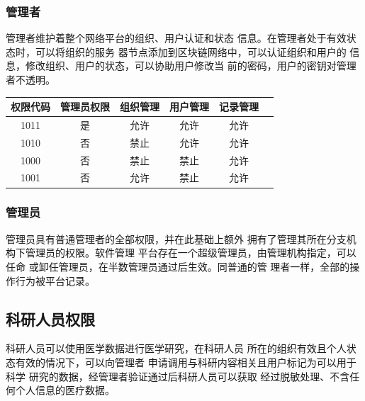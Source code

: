 \documentclass[UTF8]{ctexart}
\begin{document}
    \subsubsection{管理者}
    \par
    管理者维护着整个网络平台的组织、用户认证和状态
    信息。在管理者处于有效状态时，可以将组织的服务
    器节点添加到区块链网络中，可以认证组织和用户的
    信息，修改组织、用户的状态，可以协助用户修改当
    前的密码，用户的密钥对管理者不透明。
    \begin{center}
        \begin{tabular}{cccccc}
            \hline
            权限代码& 管理员权限& 组织管理& 用户管理& 记录管理\\
            \hline
            1011& 是& 允许& 允许& 允许\\
            1010& 否& 禁止& 允许& 允许\\
            1000& 否& 禁止& 禁止& 允许\\
            1001& 否& 允许& 禁止& 允许\\
            \hline
        \end{tabular}
    \end{center}
    \subsubsection{管理员}
    \par
    管理员具有普通管理者的全部权限，并在此基础上额外
    拥有了管理其所在分支机构下管理员的权限。软件管理
    平台存在一个超级管理员，由管理机构指定，可以任命
    或卸任管理员，在半数管理员通过后生效。同普通的管
    理者一样，全部的操作行为被平台记录。
    \subsection{科研人员权限}
    \par
    科研人员可以使用医学数据进行医学研究，在科研人员
    所在的组织有效且个人状态有效的情况下，可以向管理者
    申请调用与科研内容相关且用户标记为可以用于科学
    研究的数据，经管理者验证通过后科研人员可以获取
    经过脱敏处理、不含任何个人信息的医疗数据。
\end{document}

